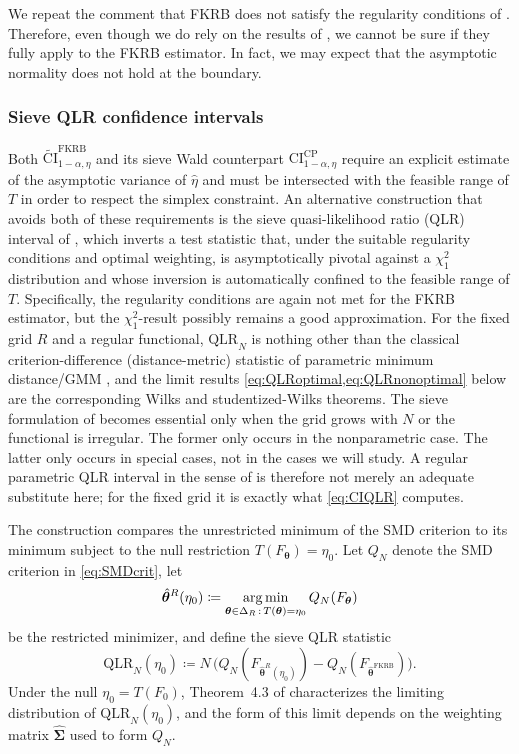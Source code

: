 We repeat the comment that FKRB does not satisfy the regularity conditions of \citet{ChenPouzo2015}.
Therefore, even though we do rely on the results of \citet[theorem~4.2]{ChenPouzo2015}, we cannot be sure if they fully apply to the FKRB estimator.
In fact, we may expect that the asymptotic normality does not hold at the boundary.
\subsubsection{Sieve QLR confidence intervals}
\label{sec:QLRCI}
Both $\widetilde{\mathrm{CI}}^{\mathrm{FKRB}}_{1-\alpha,\eta}$ and its sieve Wald counterpart $\mathrm{CI}^{\mathrm{CP}}_{1-\alpha,\eta}$ require an explicit estimate of the asymptotic variance of $\hat{\eta}$ and must be intersected with the feasible range of $T$ in order to respect the simplex constraint.
An alternative construction that avoids both of these requirements is the sieve quasi-likelihood ratio (QLR) interval of \citet[][sec.~4.3]{ChenPouzo2015}, which inverts a test statistic that, under the suitable regularity conditions and optimal weighting, is asymptotically pivotal against a $\chi^2_1$ distribution and whose inversion is automatically confined to the feasible range of $T$.
Specifically, the regularity conditions are again not met for the FKRB estimator, but the $\chi_1^2$-result possibly remains a good approximation.
For the fixed grid $R$ and a regular functional, $\mathrm{QLR}_N$ is nothing other than the classical criterion-difference (distance-metric) statistic of parametric minimum distance/GMM \citep[see][sec.~9]{NeweyMcFadden1994}, and the limit results \cref{eq:QLRoptimal,eq:QLRnonoptimal} below are the corresponding Wilks and studentized-Wilks theorems.
The sieve formulation of \citet{ChenPouzo2015} becomes essential only when the grid grows with $N$ or the functional is irregular.
The former only occurs in the nonparametric case.
The latter only occurs in special cases, not in the cases we will study.
A regular parametric QLR interval in the sense of \citet{NeweyMcFadden1994} is therefore not merely an adequate substitute here; for the fixed grid it is exactly what \cref{eq:CIQLR} computes.

The construction compares the unrestricted minimum of the SMD criterion to its minimum subject to the null restriction $T(F_{\bm{\theta}}) = \eta_0$.
Let $Q_N$ denote the SMD criterion in \cref{eq:SMDcrit}, let
\begin{equation}
\label{eq:thetaRestricted}
    \hat{\bm{\theta}}^{R}(\eta_0) \coloneq \operatorname*{arg\,min}_{\bm{\theta}\in\Delta_R\,:\,T(\bm{\theta}) = \eta_0} Q_N(F_{\bm{\theta}})
\end{equation}
be the restricted minimizer, and define the sieve QLR statistic
\begin{equation}
\label{eq:QLRstat}
    \mathrm{QLR}_N(\eta_0) \coloneq N\,\bigl(Q_N(F_{\hat{\bm{\theta}}^R(\eta_0)}) - Q_N(F_{\hat{\bm{\theta}}^{\mathrm{FKRB}}})\bigr).
\end{equation}
Under the null $\eta_0 = T(F_0)$, Theorem~4.3 of \citet{ChenPouzo2015} characterizes the limiting distribution of $\mathrm{QLR}_N(\eta_0)$, and the form of this limit depends on the weighting matrix $\hat{\bm{\Sigma}}$ used to form $Q_N$.

